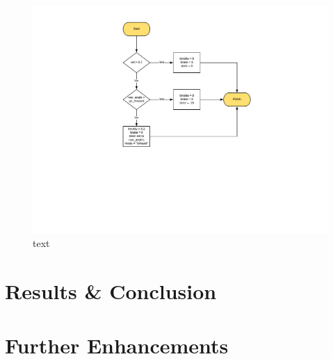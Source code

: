 \documentclass[a4paper]{article}
\begin{document}
\begin{figure}
\hspace{-1cm}
\includegraphics[scale=0.6]{stop_flow}
\caption{text}
\end{figure}

\clearpage

\section{Results \& Conclusion}

\section{Further Enhancements}

\newpage
\end{document}

